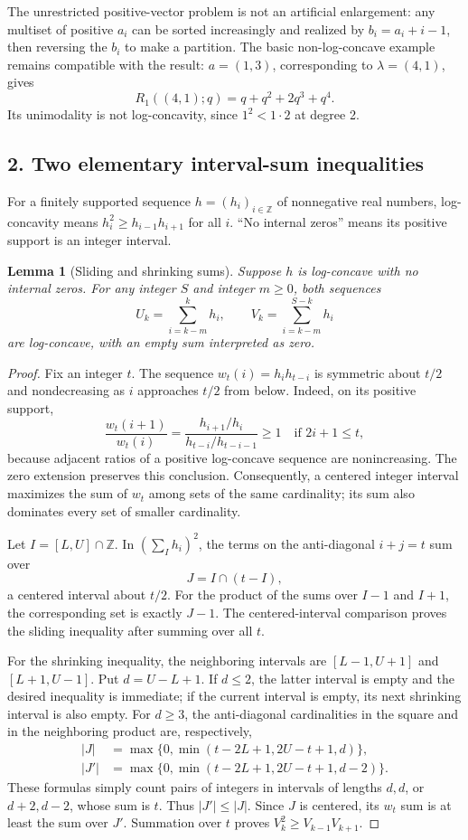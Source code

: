 \documentclass[11pt]{article}
\newtheorem{lemma}{Lemma}
\begin{document}
The unrestricted positive-vector problem is not an artificial enlargement:
any multiset of positive $a_i$ can be sorted increasingly and realized by
$b_i=a_i+i-1$, then reversing the $b_i$ to make a partition.
The basic non-log-concave example remains compatible with the result:
$a=(1,3)$, corresponding to $\lambda=(4,1)$, gives
\[
 R_1((4,1);q)=q+q^2+2q^3+q^4.
\]
Its unimodality is not log-concavity, since $1^2<1\cdot2$ at degree 2.

\subsection*{2. Two elementary interval-sum inequalities}
For a finitely supported sequence $h=(h_i)_{i\in\mathbb Z}$ of nonnegative
real numbers, log-concavity means $h_i^2\ge h_{i-1}h_{i+1}$ for all $i$.
``No internal zeros'' means its positive support is an integer interval.

\begin{lemma}[Sliding and shrinking sums]\label{lem:interval}
Suppose $h$ is log-concave with no internal zeros. For any integer $S$ and
integer $m\ge0$, both sequences
\[
 U_k=\sum_{i=k-m}^{k}h_i,
 \qquad
 V_k=\sum_{i=k-m}^{S-k}h_i
\]
are log-concave, with an empty sum interpreted as zero.
\end{lemma}
\begin{proof}
Fix an integer $t$. The sequence $w_t(i)=h_i h_{t-i}$ is symmetric about
$t/2$ and nondecreasing as $i$ approaches $t/2$ from below. Indeed, on its
positive support,
\[
 \frac{w_t(i+1)}{w_t(i)}=
 \frac{h_{i+1}/h_i}{h_{t-i}/h_{t-i-1}}\ge1
 \quad\text{if }2i+1\le t,
\]
because adjacent ratios of a positive log-concave sequence are
nonincreasing. The zero extension preserves this conclusion.
Consequently, a centered integer interval maximizes the sum of $w_t$
among sets of the same cardinality; its sum also dominates every set
of smaller cardinality.

Let $I=[L,U]\cap\mathbb Z$. In $(\sum_Ih_i)^2$, the terms on the
anti-diagonal $i+j=t$ sum over
\[
 J=I\cap(t-I),
\]
a centered interval about $t/2$.
For the product of the sums over $I-1$ and $I+1$, the corresponding set
is exactly $J-1$. The centered-interval comparison proves the sliding
inequality after summing over all $t$.

For the shrinking inequality, the neighboring intervals are
$[L-1,U+1]$ and $[L+1,U-1]$. Put $d=U-L+1$.
If $d\le2$, the latter interval is empty and the desired inequality is
immediate; if the current interval is empty, its next shrinking interval
is also empty. For $d\ge3$, the anti-diagonal cardinalities in the square
and in the neighboring product are, respectively,
\begin{align*}
 |J|&=\max\{0,\min(t-2L+1,2U-t+1,d)\},\\
 |J'|&=\max\{0,\min(t-2L+1,2U-t+1,d-2)\}.
\end{align*}
These formulas simply count pairs of integers in intervals of lengths
$d,d$, or $d+2,d-2$, whose sum is $t$. Thus $|J'|\le|J|$.
Since $J$ is centered, its $w_t$ sum is at least the sum over $J'$.
Summation over $t$ proves $V_k^2\ge V_{k-1}V_{k+1}$.
\end{proof}
\end{document}
